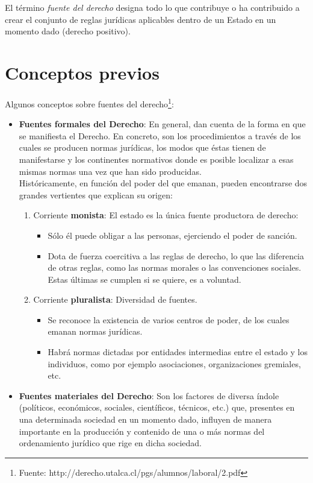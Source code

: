 \documentclass[spanish,12pt,a4paper,titlepage]{report}
\begin{document}
El término \textit{fuente del derecho} designa todo lo que contribuye o ha contribuido a crear el conjunto de reglas jurídicas aplicables dentro de un Estado en un momento dado (derecho positivo).

\section{Conceptos previos}
\label{sec:conceptos-previos}

Algunos conceptos sobre fuentes del derecho\footnote{Fuente: http://derecho.utalca.cl/pgs/alumnos/laboral/2.pdf}:

\begin{itemize}
\item \textbf{Fuentes formales del Derecho}: En general, dan cuenta de la forma en que se manifiesta el Derecho. En concreto, son los procedimientos a través de los cuales se producen normas jurídicas, los modos que éstas tienen de manifestarse y los  continentes normativos donde es posible localizar a esas mismas normas una vez que han sido producidas.\\
  Históricamente, en función del poder del que emanan, pueden encontrarse dos grandes vertientes que explican su origen:
  \begin{enumerate}
  \item Corriente \textbf{monista}: El estado es la única fuente productora de derecho:
    \begin{itemize}
    \item Sólo él puede obligar a las personas, ejerciendo el poder de sanción.
    \item Dota de fuerza coercitiva a las reglas de derecho, lo que las diferencia de otras reglas, como las normas morales o las convenciones sociales. Estas últimas se cumplen si se quiere, es a voluntad.
    \end{itemize}
  \item Corriente \textbf{pluralista}: Diversidad de fuentes.
    \begin{itemize}
    \item Se reconoce la existencia de varios centros de poder, de los cuales emanan normas jurídicas.
    \item Habrá normas dictadas por entidades intermedias entre el estado y los individuos, como por ejemplo asociaciones, organizaciones gremiales, etc.
    \end{itemize}
  \end{enumerate}
\item \textbf{Fuentes materiales del Derecho}: Son los factores de diversa índole (políticos, económicos, sociales, científicos, técnicos, etc.) que, presentes en una determinada sociedad en un momento dado, influyen de manera importante en la producción y contenido de una o más normas del ordenamiento jurídico que rige en dicha sociedad.\\

\end{itemize}
\end{document}
